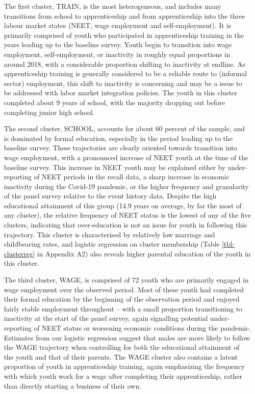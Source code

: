 \documentclass[
  a4paper, twoside, 12pt]{book}
\begin{document}
The first cluster, TRAIN, is the most heterogeneous, and includes many transitions from school to apprenticeship and from apprenticeship into the three labour market states (NEET, wage employment and self-employment). It is primarily comprised of youth who participated in apprenticeship training in the years leading up to the baseline survey. Youth begin to transition into wage employment, self-employment, or inactivity in roughly equal proportions in around 2018, with a considerable proportion shifting to inactivity at endline. As apprenticeship training is generally considered to be a reliable route to (informal sector) employment, this shift to inactivity is concerning and may be a issue to be addressed with labor market integration policies. The youth in this cluster completed about 9 years of school, with the majority dropping out before completing junior high school.

The second cluster, SCHOOL, accounts for about 60 percent of the sample, and is dominated by formal education, especially in the period leading up to the baseline survey. These trajectories are clearly oriented towards transition into wage employment, with a pronounced increase of NEET youth at the time of the baseline survey. This increase in NEET youth may be explained either by under-reporting of NEET periods in the recall data, a sharp increase in economic inactivity during the Covid-19 pandemic, or the higher frequency and granularity of the panel survey relative to the event history data. Despite the high educational attainment of this group (14.9 years on average, by far the most of any cluster), the relative frequency of NEET status is the lowest of any of the five clusters, indicating that over-education is not an issue for youth in following this trajectory. This cluster is characterised by relatively low marriage and childbearing rates, and logistic regression on cluster membership (Table \ref{tbl-clusterreg} in Appendix A2) also reveals higher parental education of the youth in this cluster.

The third cluster, WAGE, is comprised of 72 youth who are primarily engaged in wage employment over the observed period. Most of these youth had completed their formal education by the beginning of the observation period and enjoyed fairly stable employment throughout -- with a small proportion transitioning to inactivity at the start of the panel survey, again signalling potential under-reporting of NEET status or worsening economic conditions during the pandemic. Estimates from our logistic regression suggest that males are more likely to follow the WAGE trajectory when controlling for both the educational attainment of the youth and that of their parents. The WAGE cluster also contains a latent proportion of youth in apprenticeship training, again emphasizing the frequency with which youth work for a wage after completing their apprenticeship, rather than directly starting a business of their own.
\end{document}
